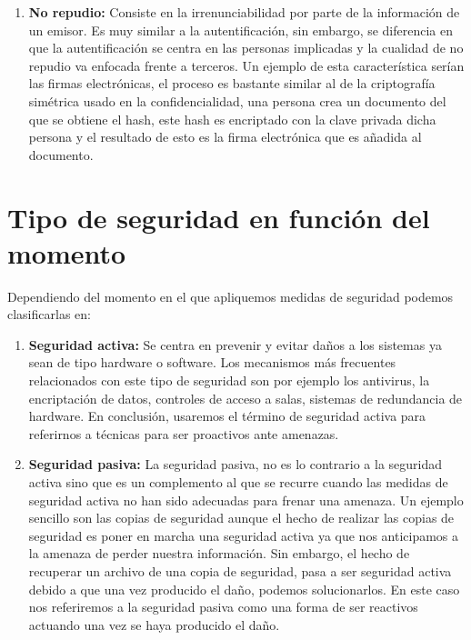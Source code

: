 \begin{enumerate}
\item {\bfseries No repudio:}
Consiste en la irrenunciabilidad por parte de la información de un emisor. Es muy similar a la autentificación, sin embargo, se diferencia en que la autentificación se centra en las personas implicadas y la cualidad de no repudio va enfocada frente a terceros. Un ejemplo de esta característica serían las firmas electrónicas, el proceso es bastante similar al de la criptografía simétrica usado en la confidencialidad, una persona crea un documento del que se obtiene el hash, este hash es encriptado con la clave privada dicha persona y el resultado de esto es la firma electrónica que es añadida al documento.
\end{enumerate}
\section{Tipo de seguridad en función del momento} 
Dependiendo del momento en el que apliquemos medidas de seguridad podemos clasificarlas en: 
\begin{enumerate}
\item {\bfseries Seguridad activa:}
Se centra en prevenir y evitar daños a los sistemas ya sean de tipo hardware o software. Los mecanismos más frecuentes relacionados con este tipo de seguridad son por ejemplo los antivirus, la encriptación de datos, controles de acceso a salas, sistemas de redundancia de hardware. En conclusión, usaremos el término de seguridad activa para referirnos a técnicas para ser proactivos ante amenazas. 
\item {\bfseries Seguridad pasiva:}
La seguridad pasiva, no es lo contrario a la seguridad activa sino que es un complemento al que se recurre cuando las medidas de seguridad activa no han sido adecuadas para frenar una amenaza. Un ejemplo sencillo son las copias de seguridad aunque el hecho de realizar las copias de seguridad es poner en marcha una seguridad activa ya que nos anticipamos a la amenaza de perder nuestra información. Sin embargo, el hecho de recuperar un archivo de una copia de seguridad, pasa a ser seguridad activa debido a que una vez producido el daño, podemos solucionarlos. En este caso nos referiremos a la seguridad pasiva como una forma de ser reactivos actuando una vez se haya producido el daño.
 \end{enumerate}




